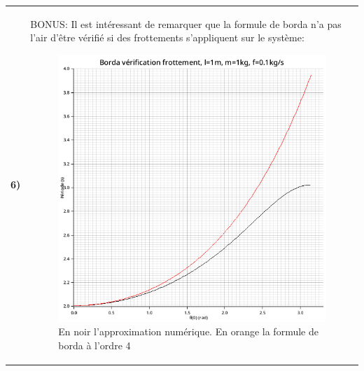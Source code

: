 \documentclass{article}
\newcommand{\question}[2]
{
    \begin{tabularx}{\linewidth}{lX}
        \textbf{#1)} & {#2}
    \end{tabularx} 
}
\begin{document}
{{    
    }

    \question{6}{
      BONUS:
      Il est intéressant de remarquer que la formule de borda n'a pas l'air d'être vérifié si des frottements s'appliquent sur le système:
    
    \begin{figure}[H]
      \centering
      \includegraphics[width=35em]{images/borda_frottement.png}
      \caption{En noir l'approximation numérique. En orange la formule de borda à l'ordre 4}
    \end{figure}
    }
   
  
}
\end{document}
